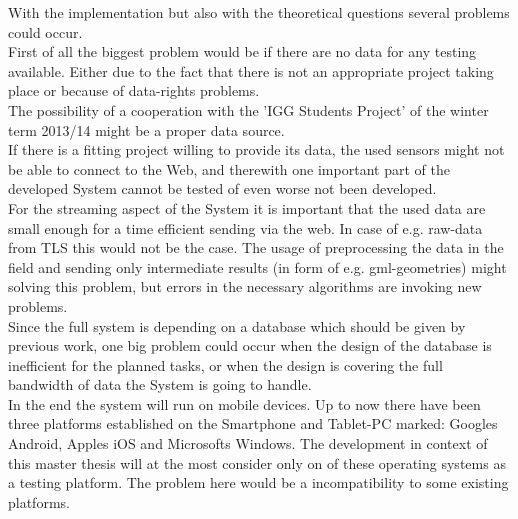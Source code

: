 With the implementation but also with the theoretical questions several problems could occur.\\
First of all the biggest problem would be if there are no data for any testing available. Either due to the fact that there is not an appropriate project taking place or because of data-rights problems.\\
The possibility of a cooperation with the 'IGG Students Project' of the winter term 2013/14 might be a proper data source.\\
If there is a fitting project willing to provide its data, the used sensors might not be able to connect to the Web, and therewith one important part of the developed System cannot be tested of even worse not been developed.\\
For the streaming aspect of the System it is important that the used data are small enough for a time efficient sending via the web. In case of e.g. raw-data from TLS this would not be the case. The usage of preprocessing the data in the field and sending only intermediate results (in form of e.g. gml-geometries) might solving this problem, but errors in the necessary algorithms are invoking new problems.\\
Since the full system is depending on a database which should be given by previous work, one big problem could occur when the design of the database is inefficient for the planned tasks, or when the design is covering the full bandwidth of data the System is going to handle.\\
In the end the system will run on mobile devices. Up to now there have been three platforms established on the Smartphone and Tablet-PC marked: Googles Android, Apples iOS and Microsofts Windows. The development in context of this master thesis will at the most consider only on of these operating systems as a testing platform. The problem here would be a incompatibility to some existing platforms.